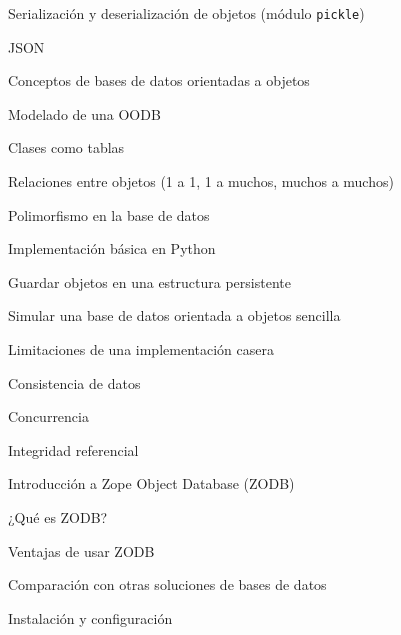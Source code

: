 \begin{longenum}
\begin{longenum}
\begin{longenum}
            \item Serialización y deserialización de objetos (módulo \texttt{pickle})
            \item JSON
        \end{longenum}
        \item Conceptos de bases de datos orientadas a objetos
        \begin{longenum}
            \item Modelado de una OODB
            \begin{longenum}
                \item Clases como tablas
                \item Relaciones entre objetos (1 a 1, 1 a muchos, muchos a muchos)
                \item Polimorfismo en la base de datos
            \end{longenum}
            \item Implementación básica en Python
            \begin{longenum}
                \item Guardar objetos en una estructura persistente
                \item Simular una base de datos orientada a objetos sencilla
            \end{longenum}
            \item Limitaciones de una implementación casera
            \begin{longenum}
                \item Consistencia de datos
                \item Concurrencia
                \item Integridad referencial
            \end{longenum}
        \end{longenum}
        \item Introducción a Zope Object Database (ZODB)
        \begin{longenum}
            \item ¿Qué es ZODB?
            \begin{longenum}
                \item Ventajas de usar ZODB
                \item Comparación con otras soluciones de bases de datos
            \end{longenum}
            \item Instalación y configuración
            \begin{longenum}

\end{longenum}
\end{longenum}
\end{longenum}
\end{longenum}
